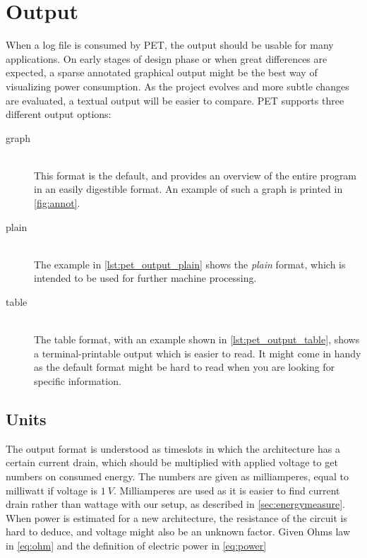 \section{Output}
\label{sec:output}

When a log file is consumed by PET, the output should be usable for many
applications. On early stages of design phase or when great differences are
expected, a sparse annotated graphical output might be the best way of
visualizing power consumption. As the project evolves and more subtle changes
are evaluated, a textual output will be easier to compare. PET supports three
different output options:

\begin{description}
    \item[graph]\hfill\\
        This format is the default, and provides an overview of
        the entire program in an easily digestible format. An example of such
        a graph is printed in \autoref{fig:annot}.
    \item[plain]\hfill\\
        The example in \autoref{lst:pet_output_plain} shows the \emph{plain}
        format, which is intended to be used for further machine processing.
    \item[table]\hfill\\
        The table format, with an example shown in
        \autoref{lst:pet_output_table}, shows a terminal-printable output which
        is easier to read. It might come in handy as the default format might be
        hard to read when you are looking for specific information.
\end{description}

\subsection{Units}

The output format is understood as timeslots in which the architecture has a
certain current drain, which should be multiplied with applied voltage to get
numbers on consumed energy. The numbers are given as milliamperes, equal to
milliwatt if voltage is $1~V$. Milliamperes are used as it is easier to find
current drain rather than wattage with our setup, as described in
\autoref{sec:energymeasure}. When power is estimated for a new architecture, the
resistance of the circuit is hard to deduce, and voltage might also be an unknown
factor. Given Ohms law in \autoref{eq:ohm} and the definition of electric power
in \autoref{eq:power}

